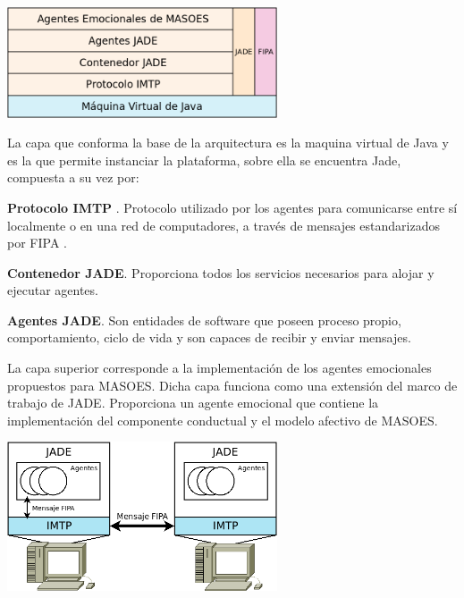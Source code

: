 \begin{ilustracion}[fuente=\yo, etiqueta=arquitectura-propuesta, titulo={Arquitectura de JADE Conjuntamente con MASOES}]
\includegraphics[width=8cm]{ilustraciones/propuesta/arquitectura.png}
\end{ilustracion}

La capa que conforma la base de la
arquitectura es la maquina virtual de Java y es la que permite
instanciar la plataforma, sobre ella se encuentra Jade, compuesta a su vez
por:

\textbf{Protocolo IMTP} .
Protocolo utilizado por los agentes
para comunicarse entre sí localmente o en una red de computadores,
a través de mensajes estandarizados por FIPA .

\textbf{Contenedor JADE}. Proporciona
todos los servicios necesarios para alojar y ejecutar agentes.

\textbf{Agentes JADE}. Son entidades de software que poseen proceso propio, comportamiento,
ciclo de vida y son capaces de recibir y enviar mensajes.

La capa superior corresponde a la implementación de los agentes emocionales
propuestos para MASOES. Dicha capa funciona como una extensión del marco de trabajo
de JADE. Proporciona un agente emocional que contiene la implementación
del componente conductual y el modelo afectivo de MASOES.

\begin{ilustracion}[fuente=\yo, etiqueta=comunicacion-entre-hosts, titulo={Comunicación Entre Agentes de JADE}]
\includegraphics[width=8cm]{ilustraciones/propuesta/comunicacion-entre-hosts.png}
\end{ilustracion}

